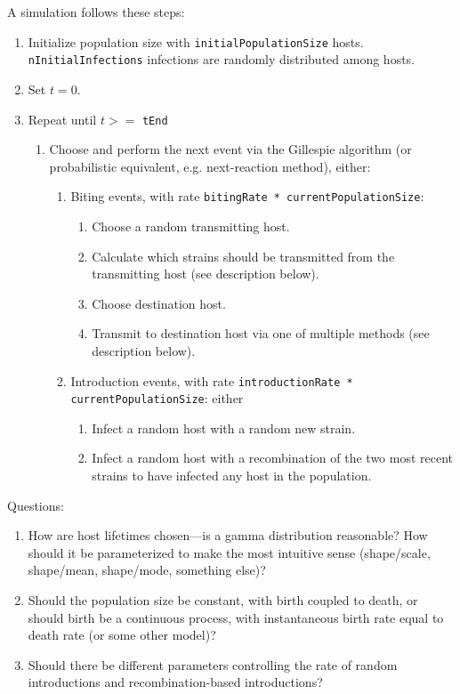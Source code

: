 \documentclass[11pt]{article}
\begin{document}
A simulation follows these steps:
\begin{enumerate}
	\item Initialize population size with \texttt{initialPopulationSize} hosts. \texttt{nInitialInfections} infections are randomly distributed among hosts.
	\item Set $t = 0$.
	\item Repeat until $t >= $ \texttt{tEnd}
	\begin{enumerate}
		\item Choose and perform the next event via the Gillespie algorithm (or probabilistic equivalent, e.g. next-reaction method), either:
		\begin{enumerate}
			\item Biting events, with rate \texttt{bitingRate * currentPopulationSize}:
			\begin{enumerate}
				\item Choose a random transmitting host.
				\item Calculate which strains should be transmitted from the transmitting host (see description below).
				\item Choose destination host.
				\item Transmit to destination host via one of multiple methods (see description below).
			\end{enumerate}
			\item Introduction events, with rate \texttt{introductionRate * currentPopulationSize}: either
			\begin{enumerate}
				\item Infect a random host with a random new strain.
				\item Infect a random host with a recombination of the two most recent strains to have infected any host in the population.
			\end{enumerate}
		\end{enumerate}
	\end{enumerate}
\end{enumerate}

Questions:
\begin{enumerate}
	\item How are host lifetimes chosen---is a gamma distribution reasonable? How should it be parameterized to make the most intuitive sense (shape/scale, shape/mean, shape/mode, something else)?
	\item Should the population size be constant, with birth coupled to death, or should birth be a continuous process, with instantaneous birth rate equal to death rate (or some other model)?
	\item Should there be different parameters controlling the rate of random introductions and recombination-based introductions?
\end{enumerate}
\end{document}
